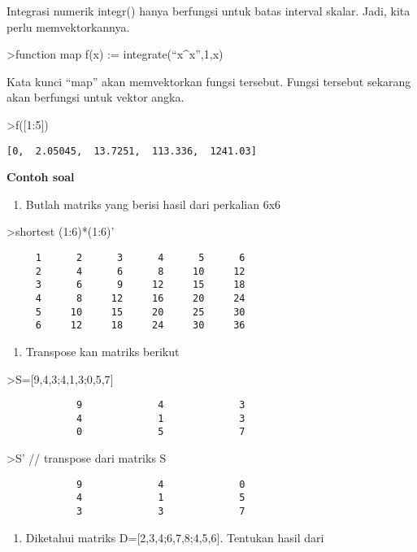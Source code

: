 \documentclass[
]{book}
\providecommand{\tightlist}{%
  \setlength{\itemsep}{0pt}\setlength{\parskip}{0pt}}
\begin{document}
Integrasi numerik integr() hanya berfungsi untuk batas interval skalar. Jadi, kita perlu memvektorkannya.

\textgreater function map f(x) := integrate(``x\^{}x'',1,x)

Kata kunci ``map'' akan memvektorkan fungsi tersebut. Fungsi tersebut sekarang akan berfungsi untuk vektor angka.

\textgreater f({[}1:5{]})

\begin{verbatim}
[0,  2.05045,  13.7251,  113.336,  1241.03]
\end{verbatim}

\textbf{Contoh soal}

\begin{enumerate}
\def\labelenumi{\arabic{enumi}.}
\tightlist
\item
  Butlah matriks yang berisi hasil dari perkalian 6x6
\end{enumerate}

\textgreater shortest (1:6)*(1:6)'

\begin{verbatim}
     1      2      3      4      5      6 
     2      4      6      8     10     12 
     3      6      9     12     15     18 
     4      8     12     16     20     24 
     5     10     15     20     25     30 
     6     12     18     24     30     36 
\end{verbatim}

\begin{enumerate}
\def\labelenumi{\arabic{enumi}.}
\setcounter{enumi}{1}
\tightlist
\item
  Transpose kan matriks berikut
\end{enumerate}

\textgreater S={[}9,4,3;4,1,3;0,5,7{]}

\begin{verbatim}
            9             4             3 
            4             1             3 
            0             5             7 
\end{verbatim}

\textgreater S' // transpose dari matriks S

\begin{verbatim}
            9             4             0 
            4             1             5 
            3             3             7 
\end{verbatim}

\begin{enumerate}
\def\labelenumi{\arabic{enumi}.}
\setcounter{enumi}{2}
\tightlist
\item
  Diketahui matriks D={[}2,3,4;6,7,8;4,5,6{]}. Tentukan hasil dari
\end{enumerate}
\end{document}
